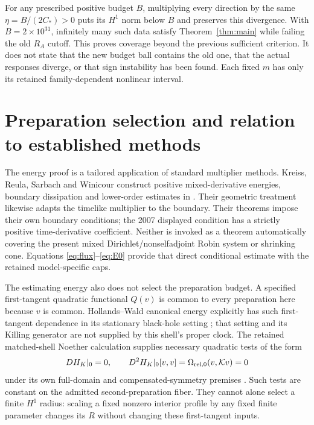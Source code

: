 \documentclass[11pt]{article}
\begin{document}
For any prescribed positive budget $B$, multiplying every direction by
the same $\eta=B/(2C_*)>0$ puts its $H^1$ norm below $B$ and preserves
this divergence. With $B=2\times10^{31}$, infinitely many such data
satisfy Theorem~\ref{thm:main} while failing the old $R_A$ cutoff.
This proves coverage beyond the previous sufficient criterion. It does
not state that the new budget ball contains the old one, that the actual
responses diverge, or that sign instability has been found. Each fixed
$m$ has only its retained family-dependent nonlinear interval.

\section{Preparation selection and relation to established methods}

The energy proof is a tailored application of standard multiplier methods.
Kreiss, Reula, Sarbach and Winicour construct positive mixed-derivative
energies, boundary dissipation and lower-order estimates in
\cite[Sec.~2 and Apps.~1--2]{KRSW2007}. Their geometric treatment
\cite{KRSW2009} likewise adapts the timelike multiplier to the boundary.
Their theorems impose their own boundary conditions; the 2007 displayed
condition has a strictly positive time-derivative coefficient.
Neither is invoked as a theorem automatically covering the present
mixed Dirichlet/nonselfadjoint Robin system or shrinking cone.
Equations \eqref{eq:flux}--\eqref{eq:E0} provide that direct conditional
estimate with the retained model-specific caps.

The estimating energy also does not select the preparation budget.
A specified first-tangent quadratic functional $Q(v)$ is common to
every preparation here because $v$ is common. Hollands--Wald canonical
energy explicitly has such first-tangent dependence in its stationary
black-hole setting \cite[Sec.~2.3]{HW}; that setting and its Killing
generator are not supplied by this shell's proper clock.
The retained matched-shell Noether calculation supplies necessary
quadratic tests of the form
\begin{equation}
 DH_K|_0=0,\qquad D^2H_K|_0[v,v]
       =\Omega_{{\rm rel},0}(v,\mathcal K v)=0
 \label{eq:Noether}
\end{equation}
under its own full-domain and compensated-symmetry premises
\cite{Noether}. Such tests are constant on the admitted second-preparation
fiber. They cannot alone select a finite $H^1$ radius: scaling a fixed
nonzero interior profile by any fixed finite parameter changes its $R$
without changing these first-tangent inputs.
\end{document}
